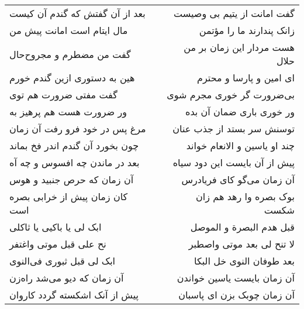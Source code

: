 \begin{center}
\begin{longtable}{l p{0.5cm} r}
بعد از آن گفتش که گندم آن کیست
&&
گفت امانت از یتیم بی وصیست
\\
مال ایتام است امانت پیش من
&&
زانک پندارند ما را مؤتمن
\\
گفت من مضطرم و مجروح‌حال
&&
هست مردار این زمان بر من حلال
\\
هین به دستوری ازین گندم خورم
&&
ای امین و پارسا و محترم
\\
گفت مفتی ضرورت هم توی
&&
بی‌ضرورت گر خوری مجرم شوی
\\
ور ضرورت هست هم پرهیز به
&&
ور خوری باری ضمان آن بده
\\
مرغ پس در خود فرو رفت آن زمان
&&
توسنش سر بستد از جذب عنان
\\
چون بخورد آن گندم اندر فخ بماند
&&
چند او یاسین و الانعام خواند
\\
بعد در ماندن چه افسوس و چه آه
&&
پیش از آن بایست این دود سیاه
\\
آن زمان که حرص جنبید و هوس
&&
آن زمان می‌گو کای فریادرس
\\
کان زمان پیش از خرابی بصره است
&&
بوک بصره وا رهد هم زان شکست
\\
ابک لی یا باکیی یا ثاکلی
&&
قبل هدم البصرة و الموصل
\\
نح علی قبل موتی واغتفر
&&
لا تنح لی بعد موتی واصطبر
\\
ابک لی قبل ثبوری فی‌النوی
&&
بعد طوفان النوی خل البکا
\\
آن زمان که دیو می‌شد راه‌زن
&&
آن زمان بایست یاسین خواندن
\\
پیش از آنک اشکسته گردد کاروان
&&
آن زمان چوبک بزن ای پاسبان
\\
\end{longtable}
\end{center}
